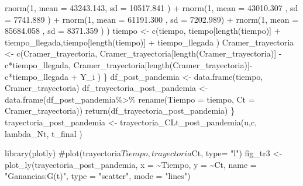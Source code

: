 \documentclass[
  us-letterpaper,
]{scrreprt}
\newenvironment{Shaded}{\begin{snugshade}}{\end{snugshade}}
\newcommand{\AttributeTok}[1]{\textcolor[rgb]{0.40,0.45,0.13}{#1}}
\newcommand{\CommentTok}[1]{\textcolor[rgb]{0.37,0.37,0.37}{#1}}
\newcommand{\DecValTok}[1]{\textcolor[rgb]{0.68,0.00,0.00}{#1}}
\newcommand{\FloatTok}[1]{\textcolor[rgb]{0.68,0.00,0.00}{#1}}
\newcommand{\FunctionTok}[1]{\textcolor[rgb]{0.28,0.35,0.67}{#1}}
\newcommand{\NormalTok}[1]{\textcolor[rgb]{0.00,0.23,0.31}{#1}}
\newcommand{\OtherTok}[1]{\textcolor[rgb]{0.00,0.23,0.31}{#1}}
\newcommand{\SpecialCharTok}[1]{\textcolor[rgb]{0.37,0.37,0.37}{#1}}
\newcommand{\StringTok}[1]{\textcolor[rgb]{0.13,0.47,0.30}{#1}}
\theoremstyle{definition}
\theoremstyle{plain}
\theoremstyle{plain}
\theoremstyle{remark}
\begin{document}
\begin{Shaded}
\begin{Highlighting}[]
\FunctionTok{rnorm}\NormalTok{(}\DecValTok{1}\NormalTok{, }\AttributeTok{mean =}   \FloatTok{43243.143}\NormalTok{, }\AttributeTok{sd =} \FloatTok{10517.841}\NormalTok{ ) }\SpecialCharTok{+} 
\FunctionTok{rnorm}\NormalTok{(}\DecValTok{1}\NormalTok{, }\AttributeTok{mean =} \FloatTok{43010.307}\NormalTok{  , }\AttributeTok{sd =} \FloatTok{7741.889}\NormalTok{ ) }\SpecialCharTok{+} 
\FunctionTok{rnorm}\NormalTok{(}\DecValTok{1}\NormalTok{, }\AttributeTok{mean =} \FloatTok{61191.300}\NormalTok{  , }\AttributeTok{sd =} \FloatTok{7202.989}\NormalTok{) }\SpecialCharTok{+} 
\FunctionTok{rnorm}\NormalTok{(}\DecValTok{1}\NormalTok{, }\AttributeTok{mean =}  \FloatTok{85684.058}\NormalTok{ , }\AttributeTok{sd =} \FloatTok{8371.359}\NormalTok{ ) ) }
\NormalTok{    tiempo }\OtherTok{\textless{}{-}} \FunctionTok{c}\NormalTok{(tiempo, tiempo[}\FunctionTok{length}\NormalTok{(tiempo)] }
    \SpecialCharTok{+}\NormalTok{ tiempo\_llegada,tiempo[}\FunctionTok{length}\NormalTok{(tiempo)]}
    \SpecialCharTok{+}\NormalTok{ tiempo\_llegada ) }
\NormalTok{    Cramer\_trayectoria }\OtherTok{\textless{}{-}} \FunctionTok{c}\NormalTok{(Cramer\_trayectoria,}
\NormalTok{    Cramer\_trayectoria[}\FunctionTok{length}\NormalTok{(Cramer\_trayectoria)]}
    \SpecialCharTok{{-}}\NormalTok{ c}\SpecialCharTok{*}\NormalTok{tiempo\_llegada,}
\NormalTok{    Cramer\_trayectoria[}\FunctionTok{length}\NormalTok{(Cramer\_trayectoria)]}\SpecialCharTok{{-}}
\NormalTok{    c}\SpecialCharTok{*}\NormalTok{tiempo\_llegada }\SpecialCharTok{+}\NormalTok{  Y\_i )}
\NormalTok{  \}}
\NormalTok{  df\_post\_pandemia }\OtherTok{\textless{}{-}} \FunctionTok{data.frame}\NormalTok{(tiempo, Cramer\_trayectoria)}
\NormalTok{df\_trayectoria\_post\_pandemia }\OtherTok{\textless{}{-}} \FunctionTok{data.frame}\NormalTok{(df\_post\_pandemia}\SpecialCharTok{\%\textgreater{}\%}
                                        \FunctionTok{rename}\NormalTok{(}\AttributeTok{Tiempo =}\NormalTok{ tiempo,}
    \AttributeTok{Ct =}\NormalTok{ Cramer\_trayectoria))}
  \FunctionTok{return}\NormalTok{(df\_trayectoria\_post\_pandemia)}
\NormalTok{\}}
\NormalTok{trayectoria\_post\_pandemia }\OtherTok{\textless{}{-}} \FunctionTok{trayectoria\_CLt\_post\_pandemia}\NormalTok{(u,c,}
\NormalTok{                                            lambda\_Nt, t\_final )}

\FunctionTok{library}\NormalTok{(plotly)}
\CommentTok{\#plot(trayectoria$Tiempo, trayectoria$Ct, type= "l")}
\NormalTok{fig\_tr3 }\OtherTok{\textless{}{-}} \FunctionTok{plot\_ly}\NormalTok{(trayectoria\_post\_pandemia, }\AttributeTok{x =} \SpecialCharTok{\textasciitilde{}}\NormalTok{Tiempo, }
                                              \AttributeTok{y =} \SpecialCharTok{\textasciitilde{}}\NormalTok{Ct,}
            \AttributeTok{name =} \StringTok{"Ganancias:G(t)"}\NormalTok{,}
            \AttributeTok{type =} \StringTok{"scatter"}\NormalTok{, }\AttributeTok{mode =} \StringTok{"lines"}\NormalTok{)}


\end{Highlighting}
\end{Shaded}
\end{document}

